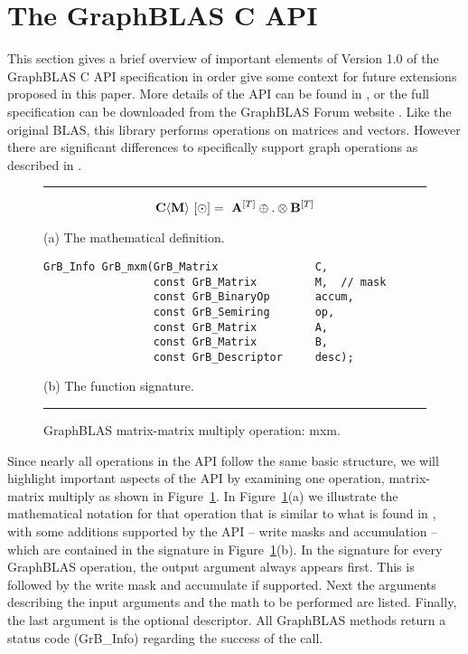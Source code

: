 %
%

\renewcommand{\vector}[1]{{\bf #1}}
\renewcommand{\matrix}[1]{{\bf #1}}

\section{The GraphBLAS C API}
\label{sec:GrBCspec}

This section gives a brief overview of important elements 
of Version 1.0 of the GraphBLAS C API specification in order give some context 
for future extensions proposed in this paper.  More details of the API can be 
found in \cite{graphblas_capi_17}, or the full specification can be downloaded 
from the GraphBLAS Forum website \cite{graphblas_web}.  Like the original BLAS, 
this library performs operations on matrices and vectors.  However there are 
significant differences to specifically support graph operations as described 
in \cite{mathgraphblas16}. 

\begin{figure}[b]
\hrule
\footnotesize
\[
\matrix{C}\langle \matrix{M} \rangle ~ [\odot] = ~ \matrix{A}^{[T]} \oplus.\otimes \matrix{B}^{[T]}
\]
\begin{center}(a) The mathematical definition.\end{center}

\begin{verbatim}
GrB_Info GrB_mxm(GrB_Matrix               C,
                 const GrB_Matrix         M,  // mask
                 const GrB_BinaryOp       accum,
                 const GrB_Semiring       op,
                 const GrB_Matrix         A, 
                 const GrB_Matrix         B,
                 const GrB_Descriptor     desc);
\end{verbatim}
\begin{center}(b) The function signature.\end{center}
\caption{GraphBLAS matrix-matrix multiply operation: {\sf mxm}.\label{Fig:mxmfig}}
\hrule
\end{figure}

Since nearly all operations in the API follow the same basic structure, we will
highlight important aspects of the API by examining one operation, matrix-matrix
multiply as shown in Figure~\ref{Fig:mxmfig}.  In Figure~\ref{Fig:mxmfig}(a) we illustrate
the mathematical notation for that operation that is similar to what is found in
\cite{mathgraphblas16}, with some additions supported by the API -- write masks and
accumulation -- which are contained in the signature in Figure~\ref{Fig:mxmfig}(b).
In the signature for every GraphBLAS operation, the output argument always 
appears first. This is followed by the write mask and accumulate if supported. 
Next the arguments describing the input arguments and the math to be performed are
listed. Finally, the last argument is the optional descriptor.  All GraphBLAS methods
return a status code ({\sf GrB\_Info}) regarding the success of the call.

